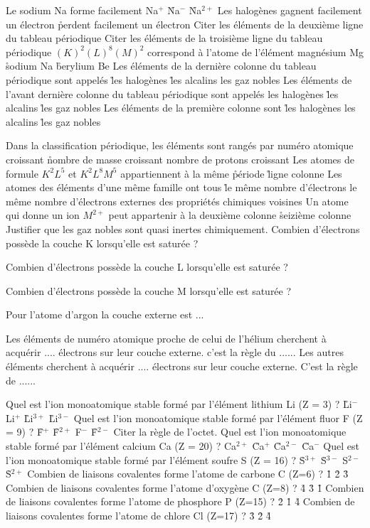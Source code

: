 \q
Le sodium Na forme facilement
\rv
Na$^{+}$
\r
Na$^{-}$
\r
Na$^{2+}$ 
\q
Les halogènes
\rv
gagnent facilement un électron
\r
perdent facilement un électron
\q
Citer les éléments de la deuxième ligne du tableau périodique
\q
Citer les éléments de la troisième ligne du tableau périodique
\q
$(K)^2(L)^8(M)^2 $ correspond à l'atome de l'élément
\rv
magnésium Mg
\r
sodium Na
\r
berylium Be
\q
Les éléments de la dernière colonne du tableau périodique sont appelés
\r
les halogènes
\r
les alcalins
\rv
les gaz nobles
\q
Les éléments de l'avant dernière colonne du tableau périodique sont appelés
\rv
les halogènes
\r
les alcalins
\r
les gaz nobles
\q
Les éléments de la première colonne sont
\r
les halogènes
\rv
les alcalins
\r 
les gaz nobles

\q
Dans la classification périodique, les éléments sont rangés par
\rv
numéro atomique croissant
\r
nombre de masse croissant
\rv
nombre de protons croissant
\q
Les atomes de formule $K^2L^5$ et $K^2L^8M^5$ appartiennent à la même
\r
période
\r
ligne
\rv 
colonne
\q
Les atomes des éléments d'une même famille ont tous
\r
le même nombre d'électrons
\rv
le même nombre d'électrons externes
\rv
des propriétés chimiques voisines
\q
Un atome qui donne un ion $M^{2+}$ peut appartenir à la 
\rv
deuxième colonne
\r
seizième colonne
\q
Justifier que les gaz nobles sont quasi inertes chimiquement.
\q
   Combien d'électrons possède la couche K lorsqu'elle est saturée ?
 
 \q
   Combien d'électrons possède la couche L lorsqu'elle est saturée ?
 \q
 
   Combien d'électrons possède la couche M lorsqu'elle est saturée ?
 
\q
   Pour l'atome d'argon la couche externe est ...
 
\q
Les éléments de numéro atomique proche de celui de l'hélium cherchent à acquérir .... électrons sur leur couche externe. c'est la règle du ......
Les autres éléments cherchent à acquérir .... électrons sur leur couche externe. C'est la règle de ......
 
\q
Quel est l'ion monoatomique stable formé par l'élément lithium Li (Z = 3) ?
\r
      Li$^{-}$
\rv
      Li$^{+}$
\r
      Li$^{3+}$
  \r
      Li$^{3-}$
\q
Quel est l'ion monoatomique stable formé par l'élément fluor F (Z = 9) ?
\r
      F$^{+}$
\r
      F$^{2+}$
\rv
      F$^{-}$
\r
      F$^{2-}$
\q
Citer la règle de l'octet.
\q
Quel est l'ion monoatomique stable formé par l'élément calcium Ca (Z = 20) ? 
\rv
      Ca$^{2+}$
\r
      Ca$^{+}$
\r
      Ca$^{2-}$
\r
      Ca$^{-}$
\q
Quel est l'ion monoatomique stable formé par l'élément soufre S (Z = 16) ? 
\r
      S$^{3+}$
\r
      S$^{3-}$
\rv
      S$^{2-}$
\r
      S$^{2+}$
\q
Combien de liaisons covalentes forme l'atome de carbone C (Z=6) ? 
\r
      1
\r
      2
\r
      3
\q
Combien de liaisons covalentes forme l'atome d'oxygène C (Z=8) ?
\r
      4
\r
      3
\r
      1
\q
Combien de liaisons covalentes forme l'atome de phosphore P (Z=15) ?
\r
      2
\r
      1
\r
      4
\q
Combien de liaisons covalentes forme l'atome de chlore Cl (Z=17) ?
\r
      3
\r
      2
\r
      4
